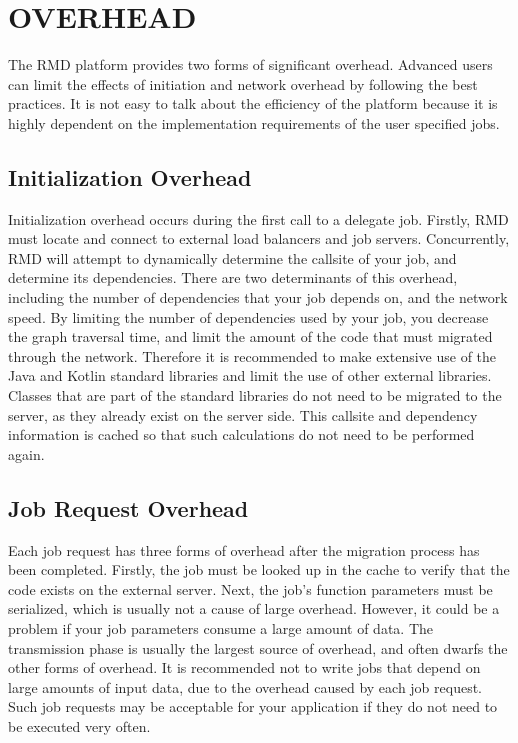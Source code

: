 \section{OVERHEAD}\label{sec:overhead}

The RMD platform provides two forms of significant overhead.
Advanced users can limit the effects of initiation and network
overhead by following the best practices.
It is not easy to talk about the efficiency of the platform
because it is highly dependent on the implementation requirements
of the user specified jobs.

\subsection{Initialization Overhead}\label{subsec:initializationOverhead}

Initialization overhead occurs during the first call to a delegate job.
Firstly, RMD must locate and connect to external load balancers and
job servers.
Concurrently, RMD will attempt to dynamically determine the callsite
of your job, and determine its dependencies.
There are two determinants of this overhead, including the
number of dependencies that your job depends on, and the network
speed.
By limiting the number of dependencies used by your job,
you decrease the graph traversal time, and limit the amount
of the code that must migrated through the network.
Therefore it is recommended to make extensive use of the Java and Kotlin
standard libraries and limit the use of other external libraries.
Classes that are part of the standard libraries do not need to be migrated
to the server, as they already exist on the server side.
This callsite and dependency information is cached so that such calculations
do not need to be performed again.


\subsection{Job Request Overhead}\label{subsec:networkOverhead}

Each job request has three forms of overhead after the migration
process has been completed.
Firstly, the job must be looked up in the cache to verify
that the code exists on the external server.
Next, the job's function parameters must be serialized, which
is usually not a cause of large overhead. However, it could be a problem
if your job parameters consume a large amount of data.
The transmission phase is usually the largest source of overhead,
and often dwarfs the other forms of overhead.
It is recommended not to write jobs that depend on large amounts
of input data, due to the overhead caused by each job request.
Such job requests may be acceptable for your application if they do
not need to be executed very often.
